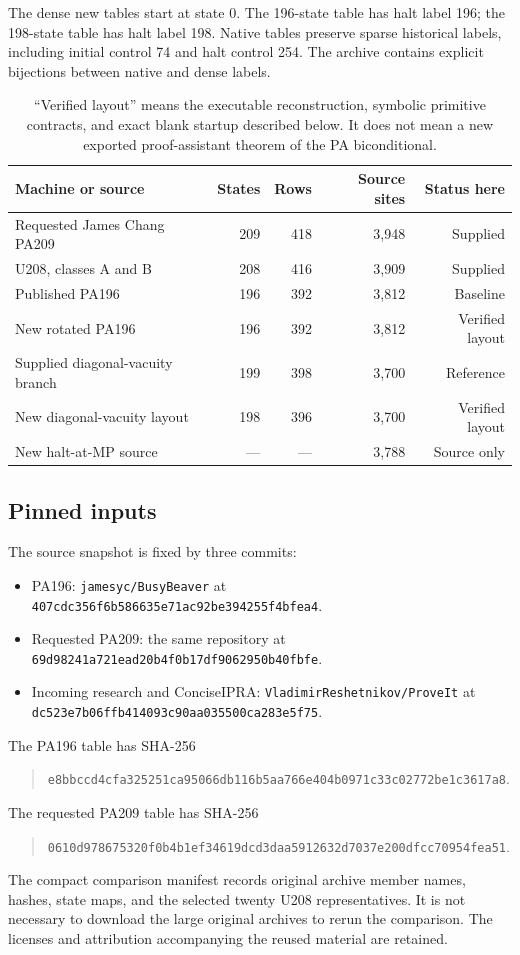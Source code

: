 \documentclass[11pt,letterpaper]{article}
\newcommand{\code}[1]{\texttt{\nolinkurl{#1}}}
\begin{document}
The dense new tables start at state 0. The 196-state table has halt label
196; the 198-state table has halt label 198. Native tables preserve sparse
historical labels, including initial control 74 and halt control 254.
The archive contains explicit bijections between native and dense labels.

\begin{table}[ht]
\centering\small
\begin{tabular}{@{}p{2.25in}rrrr@{}}
\toprule
Machine or source & States & Rows & Source sites & Status here\\
\midrule
Requested James Chang PA209 & 209 & 418 & 3,948 & Supplied\\
U208, classes A and B & 208 & 416 & 3,909 & Supplied\\
Published PA196 & 196 & 392 & 3,812 & Baseline\\
New rotated PA196 & 196 & 392 & 3,812 & Verified layout\\
Supplied diagonal-vacuity branch & 199 & 398 & 3,700 & Reference\\
New diagonal-vacuity layout & 198 & 396 & 3,700 & Verified layout\\
New halt-at-MP source & --- & --- & 3,788 & Source only\\
\bottomrule
\end{tabular}
\caption{``Verified layout'' means the executable reconstruction, symbolic
primitive contracts, and exact blank startup described below. It does not
mean a new exported proof-assistant theorem of the PA biconditional.}
\end{table}

\begin{samepage}
\subsection{Pinned inputs}

The source snapshot is fixed by three commits:
\begin{itemize}
\item PA196: \code{jamesyc/BusyBeaver} at
\code{407cdc356f6b586635e71ac92be394255f4bfea4}.
\item Requested PA209: the same repository at
\code{69d98241a721ead20b4f0b17df9062950b40fbfe}.
\item Incoming research and ConciseIPRA: \code{VladimirReshetnikov/ProveIt}
at \code{dc523e7b06ffb414093c90aa035500ca283e5f75}.
\end{itemize}
\end{samepage}
The PA196 table has SHA-256
\begin{quote}\small\nolinkurl{e8bbccd4cfa325251ca95066db116b5aa766e404b0971c33c02772be1c3617a8}.\end{quote}
The requested PA209 table has SHA-256
\begin{quote}\small\nolinkurl{0610d978675320f0b4b1ef34619dcd3daa5912632d7037e200dfcc70954fea51}.\end{quote}
The compact comparison manifest records original archive member names,
hashes, state maps, and the selected twenty U208 representatives. It is
not necessary to download the large original archives to rerun the
comparison. The licenses and attribution accompanying the reused material
are retained.
\end{document}
